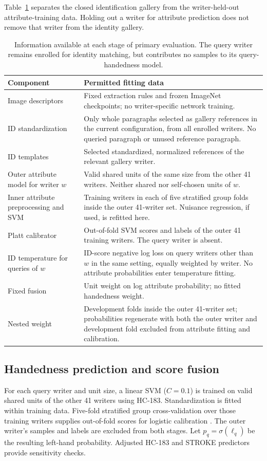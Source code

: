 Table~\ref{tab:mainnesting} separates the closed identification gallery from the writer-held-out attribute-training data. Holding out a writer for attribute prediction does not remove that writer from the identity gallery.

\begin{table}[!t]
\caption{Information available at each stage of primary evaluation. The query writer remains enrolled for identity matching, but contributes no samples to its query-handedness model.}\label{tab:mainnesting}
\centering\small
\begin{tabularx}{\textwidth}{p{}X}\toprule
Component & Permitted fitting data\\\midrule
Image descriptors & Fixed extraction rules and frozen ImageNet checkpoints; no writer-specific network training.\\
ID standardization & Only whole paragraphs selected as gallery references in the current configuration, from all enrolled writers. No queried paragraph or unused reference paragraph.\\
ID templates & Selected standardized, normalized references of the relevant gallery writer.\\
Outer attribute model for writer $w$ & Valid shared units of the same size from the other 41 writers. Neither shared nor self-chosen units of $w$.\\
Inner attribute preprocessing and SVM & Training writers in each of five stratified group folds inside the outer 41-writer set. Nuisance regression, if used, is refitted here.\\
Platt calibrator & Out-of-fold SVM scores and labels of the outer 41 training writers. The query writer is absent.\\
ID temperature for queries of $w$ & ID-score negative log loss on query writers other than $w$ in the same setting, equally weighted by writer. No attribute probabilities enter temperature fitting.\\
Fixed fusion & Unit weight on log attribute probability; no fitted handedness weight.\\
Nested weight & Development folds inside the outer 41-writer set; probabilities regenerate with both the outer writer and development fold excluded from attribute fitting and calibration.\\\bottomrule
\end{tabularx}
\end{table}

\subsection{Handedness prediction and score fusion}
For each query writer and unit size, a linear SVM ($C=0.1$) is trained on valid shared units of the other 41 writers using HC-183. Standardization is fitted within training data. Five-fold stratified group cross-validation over those training writers supplies out-of-fold scores for logistic calibration \cite{platt1999probabilistic}. The outer writer's samples and labels are excluded from both stages. Let $p_q=\sigma(\ell_q)$ be the resulting left-hand probability. Adjusted HC-183 and STROKE predictors provide sensitivity checks.

